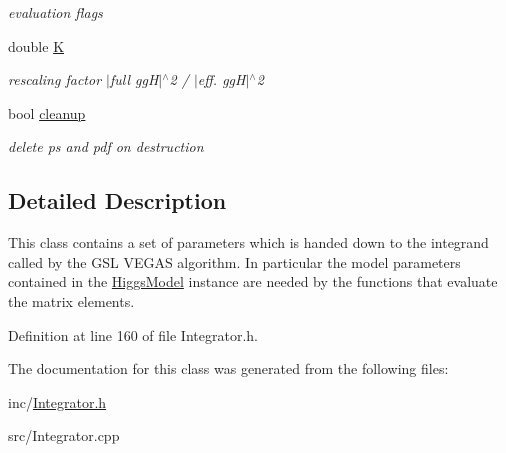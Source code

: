 \begin{DoxyCompactItemize}
\begin{DoxyCompactList}\small\item\em evaluation flags \end{DoxyCompactList}\item 
\hypertarget{classintegrand__par_afae7075055e10bd188d53fe2e1edd1e3}{}double \hyperlink{classintegrand__par_afae7075055e10bd188d53fe2e1edd1e3}{K}\label{classintegrand__par_afae7075055e10bd188d53fe2e1edd1e3}

\begin{DoxyCompactList}\small\item\em rescaling factor $\vert$full gg\+H$\vert$$^\wedge$2 / $\vert$eff. gg\+H$\vert$$^\wedge$2 \end{DoxyCompactList}\item 
\hypertarget{classintegrand__par_a1655b43b8c9e09a8bfbab014375aca49}{}bool \hyperlink{classintegrand__par_a1655b43b8c9e09a8bfbab014375aca49}{cleanup}\label{classintegrand__par_a1655b43b8c9e09a8bfbab014375aca49}

\begin{DoxyCompactList}\small\item\em delete ps and pdf on destruction \end{DoxyCompactList}\end{DoxyCompactItemize}


\subsection{Detailed Description}
This class contains a set of parameters which is handed down to the integrand called by the G\+S\+L V\+E\+G\+A\+S algorithm. In particular the model parameters contained in the \hyperlink{classHiggsModel}{Higgs\+Model} instance are needed by the functions that evaluate the matrix elements. 

Definition at line 160 of file Integrator.\+h.



The documentation for this class was generated from the following files\+:\begin{DoxyCompactItemize}
\item 
inc/\hyperlink{Integrator_8h}{Integrator.\+h}\item 
src/Integrator.\+cpp\end{DoxyCompactItemize}
